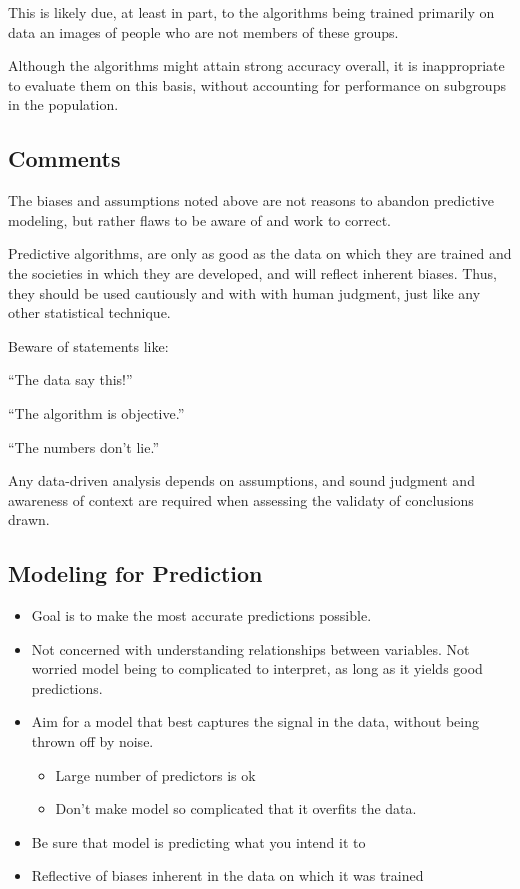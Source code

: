 \documentclass[
  letterpaper,
  DIV=11,
  numbers=noendperiod]{scrreprt}
\providecommand{\tightlist}{%
  \setlength{\itemsep}{0pt}\setlength{\parskip}{0pt}}\usepackage{longtable,booktabs,array}
\begin{document}
This is likely due, at least in part, to the algorithms being trained
primarily on data an images of people who are not members of these
groups.

Although the algorithms might attain strong accuracy overall, it is
inappropriate to evaluate them on this basis, without accounting for
performance on subgroups in the population.

\subsection{Comments}\label{comments}

The biases and assumptions noted above are not reasons to abandon
predictive modeling, but rather flaws to be aware of and work to
correct.

Predictive algorithms, are only as good as the data on which they are
trained and the societies in which they are developed, and will reflect
inherent biases. Thus, they should be used cautiously and with with
human judgment, just like any other statistical technique.

Beware of statements like:

``The data say this!''

``The algorithm is objective.''

``The numbers don't lie.''

Any data-driven analysis depends on assumptions, and sound judgment and
awareness of context are required when assessing the validaty of
conclusions drawn.

\subsection{Modeling for Prediction}\label{modeling-for-prediction-2}

\begin{itemize}
\tightlist
\item
  Goal is to make the most accurate predictions possible.\\
\item
  Not concerned with understanding relationships between variables. Not
  worried model being to complicated to interpret, as long as it yields
  good predictions.\\
\item
  Aim for a model that best captures the signal in the data, without
  being thrown off by noise.\\

  \begin{itemize}
  \tightlist
  \item
    Large number of predictors is ok\\
  \item
    Don't make model so complicated that it overfits the data.\\
  \end{itemize}
\item
  Be sure that model is predicting what you intend it to\\
\item
  Reflective of biases inherent in the data on which it was trained
\end{itemize}
\end{document}
